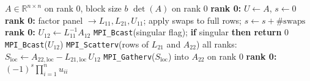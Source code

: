 \begin{algorithm}
\caption{MPI blocked PLU determinant}
\begin{algorithmic}[1]
\Require $A \in \mathbb{R}^{n \times n}$ on rank 0, block size $b$
\Ensure $\det(A)$ on rank 0
\State \textbf{rank 0:} $U \gets A$, $s \gets 0$
    \State \textbf{rank 0:} factor panel $\to L_{11}, L_{21}, U_{11}$;
           apply swaps to full rows; $s \gets s + \#\text{swaps}$
    \State \textbf{rank 0:} $U_{12} \gets L_{11}^{-1} A_{12}$
    \State \texttt{MPI\_Bcast}(singular flag); \textbf{if} singular \textbf{then return} $0$
    \State \texttt{MPI\_Bcast}($U_{12}$)
    \State \texttt{MPI\_Scatterv}(rows of $L_{21}$ and $A_{22}$)
    \State all ranks: $S_\text{loc} \gets A_{22,\text{loc}} - L_{21,\text{loc}}\, U_{12}$
    \State \texttt{MPI\_Gatherv}($S_\text{loc}$) into $A_{22}$ on rank 0
\EndFor
\State \textbf{rank 0:} \Return $(-1)^s \prod_{i=1}^{n} u_{ii}$
\end{algorithmic}
\end{algorithm}
